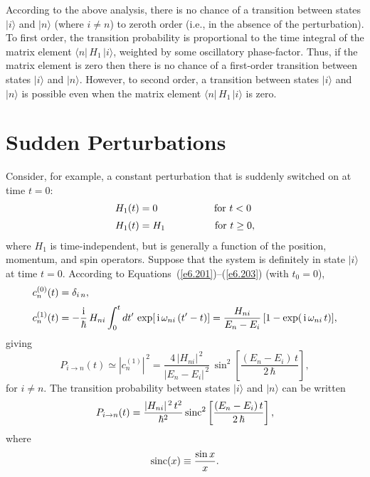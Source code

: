 According to the above analysis, there is no chance of a
transition between states $|i\rangle$ and $|n\rangle$ (where $i\neq n$)
to zeroth order ({\rm i.e.}, in the absence of the perturbation). To
first order, the transition probability is proportional to
the time integral of the matrix element $\langle n|\,H_1\,| i\rangle$,
weighted by some oscillatory phase-factor. Thus, if the matrix
element is zero then there is no chance of a first-order transition between
states $|i\rangle$ and $|n\rangle$. However, to second order,
a transition between states $|i\rangle$ and $|n\rangle$ is possible
even when the
matrix element $\langle n|\,H_1\,| i\rangle$ is zero.

\section{Sudden Perturbations}\label{s8.6}
Consider, for example, a constant perturbation that is suddenly switched on at time
$t=0$:
\begin{align}
H_1(t) &= 0 \mbox{\hspace{2.0cm}for $t<0$}\nonumber \\[0.5ex]
H_1(t) &= H_1\mbox{\hspace{1.75cm}for $t\geq 0$},\label{e6.207}
\end{align}
where $H_1$ is time-independent, but is generally a function of 
the position,
momentum, and spin operators. Suppose that the system is definitely
in state $|i\rangle$ at time $t=0$. According to Equations~(\ref{e6.201})--(\ref{e6.203}) (with
$t_0 = 0$),
\begin{align}
c_n^{(0)}(t) &= \delta_{i\,n},\\[0.5ex]
c_n^{(1)}(t) &= -\frac{{\rm i}}{\hbar}\, H_{ni} \int_0^t  dt'\,\exp[\,{\rm i}\,
\omega_{ni}\,(t'-t)]= \frac{H_{ni}}{E_n - E_i}\, [1- \exp(\,{\rm i}\,\omega_{ni}\,t)],\label{e6.209}
\end{align}
giving
\begin{equation}
P_{i\rightarrow n}(t) \simeq |c_n^{(1)}|^{\,2} = \frac{4\,|H_{ni}|^{\,2}}{|E_n - E_i|^{\,2}}\,
\sin^2\left[ \frac{(E_n-E_i)\,t}{2\,\hbar}\right],
\end{equation}
for $i\neq n$. 
The transition probability between states $|i\rangle$ and $|n\rangle$
can be written
\begin{equation}\label{e6.211}
P_{i\rightarrow n}(t) = \frac{|H_{ni}|^{\,2} \,t^2}{\hbar^2} \,{\rm sinc}^2\left[ \frac{(E_n-E_i)\,t}{2\,\hbar}\right],
\end{equation}
where 
\begin{equation}
{\rm sinc}(x)\equiv  \frac{\sin x}{x}.
\end{equation}
